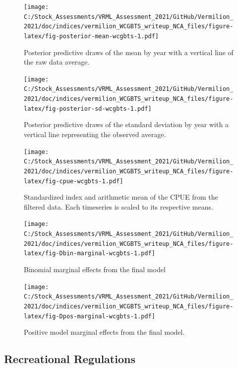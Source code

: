 \documentclass[
  english,
  a4paper,
]{article}
\begin{document}
\begin{figure}
\centering
\texttt{[image: C:/Stock\_Assessments/VRML\_Assessment\_2021/GitHub/Vermilion\_2021/doc/indices/vermilion\_WCGBTS\_writeup\_NCA\_files/figure-latex/fig-posterior-mean-wcgbts-1.pdf]}
\caption{\label{fig:fig-posterior-mean-wcgbts}Posterior predictive draws of the mean by year with a vertical line of the raw data average.}
\end{figure}

\begin{figure}
\centering
\texttt{[image: C:/Stock\_Assessments/VRML\_Assessment\_2021/GitHub/Vermilion\_2021/doc/indices/vermilion\_WCGBTS\_writeup\_NCA\_files/figure-latex/fig-posterior-sd-wcgbts-1.pdf]}
\caption{\label{fig:fig-posterior-sd-wcgbts}Posterior predictive draws of the standard deviation by year with a vertical line representing the observed average.}
\end{figure}

\begin{figure}
\centering
\texttt{[image: C:/Stock\_Assessments/VRML\_Assessment\_2021/GitHub/Vermilion\_2021/doc/indices/vermilion\_WCGBTS\_writeup\_NCA\_files/figure-latex/fig-cpue-wcgbts-1.pdf]}
\caption{\label{fig:fig-cpue-wcgbts}Standardized index and arithmetic mean of the CPUE from the filtered data. Each timeseries is scaled to its respective means.}
\end{figure}

\begin{figure}
\centering
\texttt{[image: C:/Stock\_Assessments/VRML\_Assessment\_2021/GitHub/Vermilion\_2021/doc/indices/vermilion\_WCGBTS\_writeup\_NCA\_files/figure-latex/fig-Dbin-marginal-wcgbts-1.pdf]}
\caption{\label{fig:fig-Dbin-marginal-wcgbts}Binomial marginal effects from the final model}
\end{figure}

\begin{figure}
\centering
\texttt{[image: C:/Stock\_Assessments/VRML\_Assessment\_2021/GitHub/Vermilion\_2021/doc/indices/vermilion\_WCGBTS\_writeup\_NCA\_files/figure-latex/fig-Dpos-marginal-wcgbts-1.pdf]}
\caption{\label{fig:fig-Dpos-marginal-wcgbts}Positive model marginal effects from the final model.}
\end{figure}

\clearpage

\hypertarget{regs-graphic}{%
\subsection{Recreational Regulations}\label{regs-graphic}}
\end{document}
